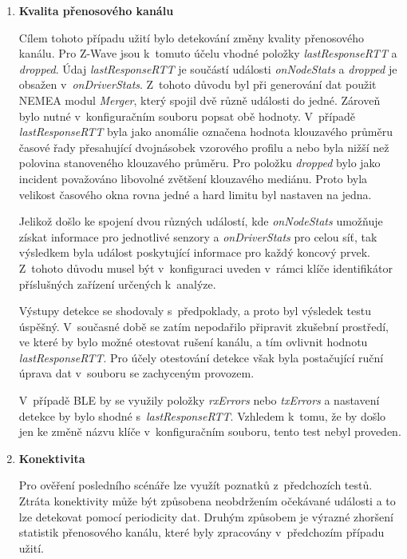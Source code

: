 \begin{enumerate}
    \item \textbf{Kvalita přenosového kanálu}
    
    Cílem tohoto případu užití bylo detekování změny kvality přenosového kanálu. Pro Z-Wave jsou 
    k~tomuto účelu vhodné položky \textit{lastResponseRTT} a \textit{dropped}. Údaj
    \textit{lastResponseRTT} je součástí události \textit{onNodeStats} a 
    \textit{dropped} je obsažen v~\textit{onDriverStats}. Z~tohoto důvodu byl při generování dat použit
    NEMEA modul \textit{Merger}, který spojil dvě různě události do jedné. Zároveň bylo nutné
    v~konfiguračním souboru
     popsat obě hodnoty. V~případě \textit{lastResponseRTT} byla jako anomálie označena
    hodnota klouzavého průměru časové řady přesahující dvojnásobek vzorového profilu a nebo byla nižší
    než polovina stanoveného klouzavého průměru. Pro položku \textit{dropped} bylo jako incident považováno
    libovolné zvětšení klouzavého mediánu. Proto byla velikost časového okna rovna jedné a hard limitu byl
    nastaven na jedna. 
    
    Jelikož došlo ke spojení dvou různých událostí, kde \textit{onNodeStats}
    umožňuje získat informace pro jednotlivé senzory a \textit{onDriverStats} pro celou síť, 
    tak výsledkem byla událost poskytující informace pro každý koncový prvek. Z~tohoto důvodu 
    musel být v~konfiguraci uveden v~rámci klíče identifikátor příslušných zařízení určených k~analýze.
    
    Výstupy detekce se shodovaly s~předpoklady, a proto byl výsledek testu úspěšný. V~současné
    době se zatím nepodařilo připravit zkušební prostředí, ve které by bylo možné otestovat
    rušení kanálu, a tím ovlivnit hodnotu \textit{lastResponseRTT}. Pro účely otestování 
    detekce však byla postačující ruční úprava dat v~souboru se zachyceným provozem. 
    
    V~případě BLE by se využily položky \textit{rxErrors} nebo \textit{txErrors} a nastavení 
    detekce by bylo shodné s~\textit{lastResponseRTT}. Vzhledem k~tomu, že by došlo jen 
    ke změně názvu klíče v~konfiguračním souboru, tento test nebyl proveden.
    
    \item \textbf{Konektivita}
    
    Pro ověření posledního scénáře lze využít poznatků z~předchozích testů. Ztráta konektivity
    může být způsobena neobdržením očekávané události a to lze detekovat pomocí periodicity dat.
    Druhým způsobem je výrazné zhoršení statistik přenosového kanálu, které byly zpracovány
    v~předchozím případu užití.
  \end{enumerate}
  
